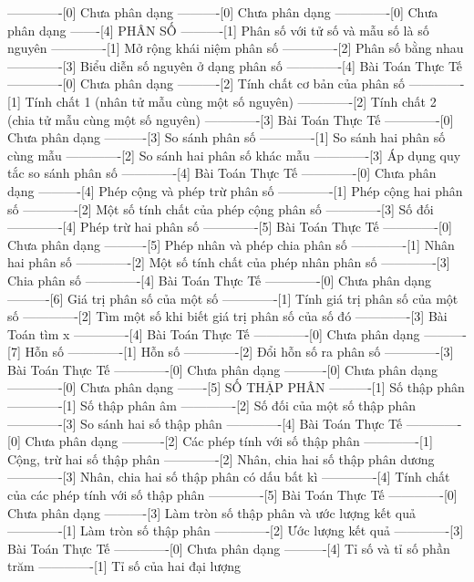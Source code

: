 -------------[0] Chưa phân dạng
----------[0] Chưa phân dạng
-------------[0] Chưa phân dạng
-------[4] PHÂN SỐ
----------[1] Phân số với tử số và mẫu số là số nguyên
-------------[1] Mở rộng khái niệm phân số
-------------[2] Phân số bằng nhau
-------------[3] Biểu diễn số nguyên ở dạng phân số
-------------[4] Bài Toán Thực Tế
-------------[0] Chưa phân dạng
----------[2] Tính chất cơ bản của phân số
-------------[1] Tính chất 1 (nhân tử mẫu cùng một số nguyên)
-------------[2] Tính chất 2 (chia tử mẫu cùng một số nguyên)
-------------[3] Bài Toán Thực Tế
-------------[0] Chưa phân dạng
----------[3] So sánh phân số
-------------[1] So sánh hai phân số cùng mẫu
-------------[2] So sánh hai phân số khác mẫu
-------------[3] Áp dụng quy tắc so sánh phân số
-------------[4] Bài Toán Thực Tế
-------------[0] Chưa phân dạng
----------[4] Phép cộng và phép trừ phân số
-------------[1] Phép cộng hai phân số
-------------[2] Một số tính chất của phép cộng phân số
-------------[3] Số đối
-------------[4] Phép trừ hai phân số
-------------[5] Bài Toán Thực Tế
-------------[0] Chưa phân dạng
----------[5] Phép nhân và phép chia phân số
-------------[1] Nhân hai phân số
-------------[2] Một số tính chất của phép nhân phân số
-------------[3] Chia phân số
-------------[4] Bài Toán Thực Tế
-------------[0] Chưa phân dạng
----------[6] Giá trị phân số của một số
-------------[1] Tính giá trị phân số của một số
-------------[2] Tìm một số khi biết giá trị phân số của số đó
-------------[3] Bài Toán tìm x
-------------[4] Bài Toán Thực Tế
-------------[0] Chưa phân dạng
----------[7] Hỗn số
-------------[1] Hỗn số
-------------[2] Đổi hỗn số ra phân số
-------------[3] Bài Toán Thực Tế
-------------[0] Chưa phân dạng
----------[0] Chưa phân dạng
-------------[0] Chưa phân dạng
-------[5] SỐ THẬP PHÂN
----------[1] Số thập phân
-------------[1] Số thập phân âm
-------------[2] Số đối của một số thập phân
-------------[3] So sánh hai số thập phân
-------------[4] Bài Toán Thực Tế
-------------[0] Chưa phân dạng
----------[2] Các phép tính với số thập phân
-------------[1] Cộng, trừ hai số thập phân
-------------[2] Nhân, chia hai số thập phân dương
-------------[3] Nhân, chia hai số thập phân có dấu bất kì
-------------[4] Tính chất của các phép tính với số thập phân
-------------[5] Bài Toán Thực Tế
-------------[0] Chưa phân dạng
----------[3] Làm tròn số thập phân và ước lượng kết quả
-------------[1] Làm tròn số thập phân
-------------[2] Ước lượng kết quả
-------------[3] Bài Toán Thực Tế
-------------[0] Chưa phân dạng
----------[4] Tỉ số và tỉ số phần trăm
-------------[1] Tỉ số của hai đại lượng
